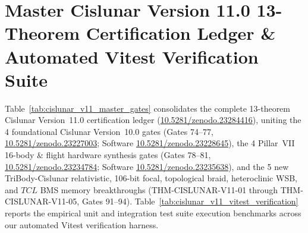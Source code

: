 \documentclass[11pt,a4paper,reqno]{article}
\def\texttt#1{#1}%
\def\mathrm#1{#1}%
\newcommand{\zenodo}[1]{\href{https://doi.org/10.5281/zenodo.#1}{\texttt{10.5281/\allowbreak zenodo.#1}}}
\theoremstyle{plain}
\theoremstyle{definition}
\theoremstyle{remark}
\numberwithin{equation}{section}
\begin{document}
\section{\texorpdfstring{Master Cislunar Version 11.0 13-Theorem Certification Ledger \& Automated Vitest Verification Suite}{Master Cislunar Version 11.0 13-Theorem Certification Ledger and Automated Vitest Verification Suite}}
\label{sec:cislunar_v11_master_ledger}

Table~\ref{tab:cislunar_v11_master_gates} consolidates the complete 13-theorem Cislunar Version~11.0 certification ledger (\zenodo{23284416}), uniting the 4 foundational Cislunar Version~10.0 gates (\texttt{Gates 74--77}, \zenodo{23227003}; Software \zenodo{23228645}), the 4 Pillar~VII 16-body \& flight hardware synthesis gates (\texttt{Gates 78--81}, \zenodo{23234784}; Software \zenodo{23235638}), and the 5 new TriBody-Cislunar relativistic, 106-bit focal, topological braid, heteroclinic WSB, and $\mathrm{TCL}$ BMS memory breakthroughs (\texttt{THM-CISLUNAR-V11-01} through \texttt{THM-CISLUNAR-V11-05}, \texttt{Gates 91--94}). Table~\ref{tab:cislunar_v11_vitest_verification} reports the empirical unit and integration test suite execution benchmarks across our automated Vitest verification harness.
\end{document}
